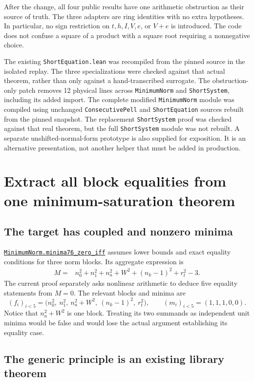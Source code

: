 \documentclass[11pt,letterpaper]{article}
\newcommand{\code}[1]{\nolinkurl{#1}}
\newcommand{\src}[2]{\href{https://github.com/VladimirReshetnikov/ProveIt/blob/9bd29079d5e1c6cc1c0bcaee6cb57d59b835cba9/Computability/DiophantineConsistency/Lean/DiophantineConsistency/#1.lean}{\code{#1.#2}}}
\begin{document}
After the change, all four public results have one arithmetic obstruction as their source of truth. The three adapters are ring identities with no extra hypotheses. In particular, no sign restriction on $t,h,I,V,e$, or $V+e$ is introduced. The code does not confuse a square of a product with a square root requiring a nonnegative choice.

The existing \code{ShortEquation.lean} was recompiled from the pinned source in the isolated replay. The three specializations were checked against that actual theorem, rather than only against a hand-transcribed surrogate. The obstruction-only patch removes 12 physical lines across \code{MinimumNorm} and \code{ShortSystem}, including its added import. The complete modified \code{MinimumNorm} module was compiled using unchanged \code{ConsecutivePell} and \code{ShortEquation} sources rebuilt from the pinned snapshot. The replacement \code{ShortSystem} proof was checked against that real theorem, but the full \code{ShortSystem} module was not rebuilt. A separate unshifted-normal-form prototype is also supplied for exposition. It is an alternative presentation, not another helper that must be added in production.

\section{Extract all block equalities from one minimum-saturation theorem}
\label{sec:minima}

\subsection{The target has coupled and nonzero minima}

\src{MinimumNorm}{minima76_zero_iff} assumes lower bounds and exact equality conditions for three norm blocks. Its aggregate expression is
\begin{align*}
 M={}&n_0^2+n_1^2+n_a^2+W^2+(n_k-1)^2+r_t^2-3.
\end{align*}
The current proof separately asks nonlinear arithmetic to deduce five equality statements from $M=0$. The relevant blocks and minima are
\[
 (f_i)_{i<5}=
 \bigl(n_0^2,\ n_1^2,\ n_a^2+W^2,\ (n_k-1)^2,\ r_t^2\bigr),
 \qquad
 (m_i)_{i<5}=(1,1,1,0,0).
\]
Notice that $n_a^2+W^2$ is one block. Treating its two summands as independent unit minima would be false and would lose the actual argument establishing its equality case.

\subsection{The generic principle is an existing library theorem}
\end{document}
